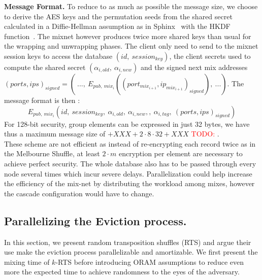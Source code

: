 \documentclass{llncs}
\newcommand{\todo}[1]{\textcolor{red}{TODO: #1}}
\begin{document}
\noindent\textbf{Message Format.}
To reduce to as much as possible the message size, we choose to derive the AES keys and the permutation seeds from the shared secret calculated in a Diffie-Hellman assumption as in Sphinx~\cite{danezis2009sphinx} with the HKDF function~\cite{krawczyk2010cryptographic}. The mixnet however produces twice more shared keys than usual for the wrapping and unwrapping phases. \iffalse\\
Let $\kappa$ be the security parameter. We call $\mathcal{G}$ a prime order cyclic group satisfying the Decisional Diffie-Hellman Assumption. $\mathcal{G}^*$ is the set of non-identity elements of $\mathcal{G}$. The element $g$ is a generator of the group, and $q$ is the prime order of $\mathcal{G}$ with $q \approx 2^{2\kappa}$.\\
We suppose each mix owns a pair of keys ($\ priv_i \in \mathbb{Z}_{q}^*$, $pub_i=g^{priv_i}\in \mathcal{G}^*$). We assume the existence of a PKI that publishes a list of all ($mix_i$,\ $pub_i$) pair.
The client randomly chooses $x\in_\mathcal{R} \mathbb{Z}_q^*$ and sends to the mix $mix_i$ the element $\alpha_i=g^{x\cdot b_i}$ with $b_i$ a binding factors, the shared secret is then $s_i=pub_i^{x\cdot b_i}$.
\fi
The client only need to send to the mixnet session keys to access the database $(id,\ session_{key})$, the client secrets used to compute the shared secret $( \alpha_{i,old},\ \alpha_{i,new} )$ and the signed next mix addresses $(ports,ips)_{signed}= \left (\ ...,\ E_{pub,\ mix_{i}}\left ((port_{mix_{i+1}}, ip_{mix_{i+1}})_{signed}\right),\ ...\right)$.
The message format is then : $$E_{pub,\ mix_i}\left(id,\ session_{key},\ \alpha_{i,old},\ \alpha_{i,new},,\ \alpha_{i,tag},\ (ports,ips)_{signed} \right)$$ 
For 128-bit security, group elements can be expressed in just 32 bytes, we have thus a maximum message size of $+XXX + 2 \cdot 8 \cdot 32 + XXX$ \todo{}.\\

These scheme are not efficient as instead of re-encrypting each record twice as in the Melbourne Shuffle, at least $2\cdot m$ encryption per element are necessary to achieve perfect security. The whole database also has to be passed through every node several times which incur severe delays. Parallelization could help increase the efficiency of the mix-net by distributing the workload among mixes, however the cascade configuration would have to change.
%
\subsection{Parallelizing the Eviction process.}\label{Parallel}
In this section, we present random transposition shuffles (RTS) and argue their use make the eviction process parallelizable and amortizable.
We first present the mixing time of $k$-RTS before introducing ORAM assumptions to reduce even more the expected time to achieve randomness to the eyes of the adversary.
%
\end{document}
